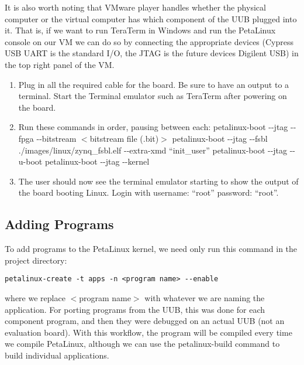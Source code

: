 It is also worth noting that VMware player handles whether the physical computer or the virtual computer has which component of the UUB plugged into it. That is, if we want to run TeraTerm in Windows and run the PetaLinux console on our VM we can do so by connecting the appropriate devices (Cypress USB UART is the standard I/O, the JTAG is the future devices Digilent USB) in the top right panel of the VM. 
\begin{enumerate}
\item Plug in all the required cable for the board. Be sure to have an output to a terminal. Start the Terminal emulator such as TeraTerm after powering on the board.
\item Run these commands in order, pausing between each:
\subitem petalinux-boot -{}-jtag -{}-fpga -{}-bitstream $<$bitstream file (.bit)$>$
\subitem petalinux-boot -{}-jtag -{}-fsbl ./images/linux/zynq\_fsbl.elf -{}-extra-xmd ``init\_user''
\subitem petalinux-boot -{}-jtag -{}-u-boot
\subitem petalinux-boot -{}-jtag -{}-kernel
\item The user should now see the terminal emulator starting to show the output of the board booting Linux. Login with username: ``root'' password: ``root''. 
\end{enumerate}
\subsection{Adding Programs}
To add programs to the PetaLinux kernel, we need only run this command in the project directory:
\begin{verbatim}
petalinux-create -t apps -n <program name> --enable
\end{verbatim}
where we replace $<$program name$>$ with whatever we are naming the application. For porting programs from the UUB, this was done for each component program, and then they were debugged on an actual UUB (not an evaluation board). With this workflow, the program will be compiled every time we compile PetaLinux, although we can use the petalinux-build command to build individual applications.
